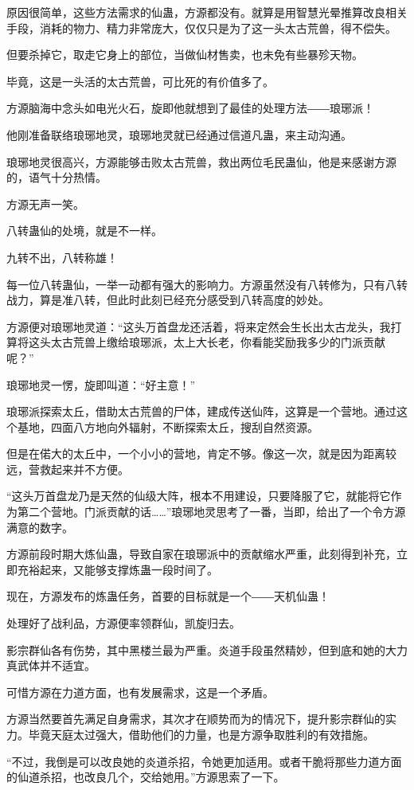 \begin{this_body}
原因很简单，这些方法需求的仙蛊，方源都没有。就算是用智慧光晕推算改良相关手段，消耗的物力、精力非常庞大，仅仅只是为了这一头太古荒兽，得不偿失。

但要杀掉它，取走它身上的部位，当做仙材售卖，也未免有些暴殄天物。

毕竟，这是一头活的太古荒兽，可比死的有价值多了。

方源脑海中念头如电光火石，旋即他就想到了最佳的处理方法――琅琊派！

他刚准备联络琅琊地灵，琅琊地灵就已经通过信道凡蛊，来主动沟通。

琅琊地灵很高兴，方源能够击败太古荒兽，救出两位毛民蛊仙，他是来感谢方源的，语气十分热情。

方源无声一笑。

八转蛊仙的处境，就是不一样。

九转不出，八转称雄！

每一位八转蛊仙，一举一动都有强大的影响力。方源虽然没有八转修为，只有八转战力，算是准八转，但此时此刻已经充分感受到八转高度的妙处。

方源便对琅琊地灵道：“这头万首盘龙还活着，将来定然会生长出太古龙头，我打算将这头太古荒兽上缴给琅琊派，太上大长老，你看能奖励我多少的门派贡献呢？”

琅琊地灵一愣，旋即叫道：“好主意！”

琅琊派探索太丘，借助太古荒兽的尸体，建成传送仙阵，这算是一个营地。通过这个基地，四面八方地向外辐射，不断探索太丘，搜刮自然资源。

但是在偌大的太丘中，一个小小的营地，肯定不够。像这一次，就是因为距离较远，营救起来并不方便。

“这头万首盘龙乃是天然的仙级大阵，根本不用建设，只要降服了它，就能将它作为第二个营地。门派贡献的话……”琅琊地灵思考了一番，当即，给出了一个令方源满意的数字。

方源前段时期大炼仙蛊，导致自家在琅琊派中的贡献缩水严重，此刻得到补充，立即充裕起来，又能够支撑炼蛊一段时间了。

现在，方源发布的炼蛊任务，首要的目标就是一个――天机仙蛊！

处理好了战利品，方源便率领群仙，凯旋归去。

影宗群仙各有伤势，其中黑楼兰最为严重。炎道手段虽然精妙，但到底和她的大力真武体并不适宜。

可惜方源在力道方面，也有发展需求，这是一个矛盾。

方源当然要首先满足自身需求，其次才在顺势而为的情况下，提升影宗群仙的实力。毕竟天庭太过强大，借助他们的力量，也是方源争取胜利的有效措施。

“不过，我倒是可以改良她的炎道杀招，令她更加适用。或者干脆将那些力道方面的仙道杀招，也改良几个，交给她用。”方源思索了一下。


\end{this_body}

